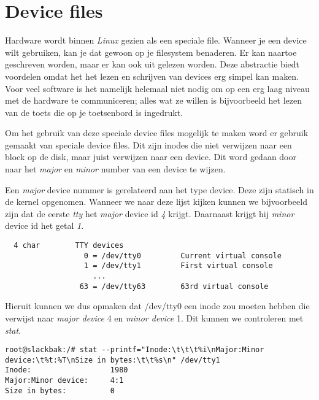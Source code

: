 %
%
%
%

\chapter{Device files}
Hardware wordt binnen \emph{Linux} gezien als een speciale file. Wanneer je een device wilt gebruiken, kan je dat gewoon op je filesystem benaderen. Er kan naartoe geschreven worden, maar er kan ook uit gelezen worden. Deze abstractie biedt voordelen omdat het het lezen en schrijven van devices erg simpel kan maken. Voor veel software is het namelijk helemaal niet nodig om op een erg laag niveau met de hardware te communiceren; alles wat ze willen is bijvoorbeeld het lezen van de toets die op je toetsenbord is ingedrukt. 

Om het gebruik van deze speciale device files mogelijk te maken word er gebruik gemaakt van speciale device files. Dit zijn inodes die niet verwijzen naar een block op de disk, maar juist verwijzen naar een device. Dit word gedaan door naar het \emph{major} en \emph{minor} number van een device te wijzen. 

Een \emph{major} device nummer is gerelateerd aan het type device. Deze zijn statisch in de kernel opgenomen\cite{bib.devices}. Wanneer we naar deze lijst kijken kunnen we bijvoorbeeld zijn dat de eerste \emph{tty} het \emph{major} device id \emph{4} krijgt. Daarnaast krijgt hij \emph{minor} device id het getal \emph{1}.
\begin{lstlisting}
  4 char        TTY devices
                  0 = /dev/tty0         Current virtual console
                  1 = /dev/tty1         First virtual console
                    ...
                 63 = /dev/tty63        63rd virtual console
\end{lstlisting}
Hieruit kunnen we dus opmaken dat /dev/tty0 een inode zou moeten hebben die verwijst naar \emph{major device} 4 en \emph{minor device} 1. Dit kunnen we controleren met \emph{stat}.
\begin{lstlisting}
root@slackbak:/# stat --printf="Inode:\t\t\t%i\nMajor:Minor device:\t%t:%T\nSize in bytes:\t\t%s\n" /dev/tty1
Inode:                  1980
Major:Minor device:     4:1
Size in bytes:          0
\end{lstlisting}

